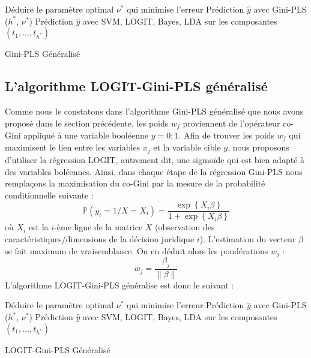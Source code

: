 \begin{algorithm}[H]
	Déduire le paramètre optimal $\nu^*$ qui minimise l'erreur \; 
	\Return Prédiction $\hat{y}$ avec Gini-PLS ($h^*$, $\nu^*$) \;
	\Return Prédiction $\hat{y}$ avec SVM, LOGIT, Bayes, LDA sur les composantes $(t_1,\ldots,t_{h^*})$\;
	\caption{Gini-PLS Généralisé}\label{G-GPLS}
\end{algorithm}
\bigskip

\subsection{L'algorithme LOGIT-Gini-PLS généralisé} 

Comme nous le constatons dans l'algorithme Gini-PLS généralisé que nous avons proposé dans le section précédente, les poids $w_j$ proviennent de l'opérateur co-Gini appliqué à une variable booléenne $y=0;1$. Afin de trouver les poids $w_j$ qui maximisent le lien entre les variables $x_j$ et la variable cible $y$, nous proposons d'utiliser la régression LOGIT, autrement dit, une sigmoïde qui est bien adapté à des variables boléennes. Ainsi, dans chaque étape de la régression Gini-PLS nous remplaçons la maximisation du co-Gini par la mesure de la probabilité conditionnelle suivante :
\begin{equation}\tag{LOGIT}
\mathbb{P}(y_i = 1 / X = X_i) = \frac{\exp\left\{X_i \beta \right\}}{1+\exp\left\{ X_i \beta \right\}}
\end{equation}
où $X_i$ est la $i$-ème ligne de la matrice $X$ (observation des caractéristiques/dimensions de la décision juridique $i$). L'estimation du vecteur $\beta$ se fait maximum de vraisemblance. On en déduit alors les pondérations $w_j$ :
\[
w_j = \frac{\beta_j}{\| \beta\|}
\]
L'algorithme LOGIT-Gini-PLS généralise est donc le suivant :

\begin{algorithm}[H]
	Déduire le paramètre optimal $\nu^*$ qui minimise l'erreur \; 
	\Return Prédiction $\hat{y}$ avec Gini-PLS ($h^*$, $\nu^*$) \;
	\Return Prédiction $\hat{y}$ avec SVM, LOGIT, Bayes, LDA sur les composantes $(t_1,\ldots,t_{h^*})$\;
	\caption{LOGIT-Gini-PLS Généralisé}\label{G-GPLS}
\end{algorithm}


